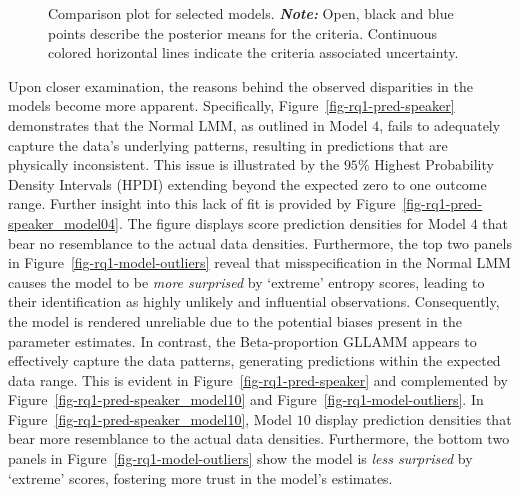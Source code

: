\documentclass[
  authoryear,
  preprint,
  1p]{elsarticle}
\begin{document}
\label{cell-fig-rq1-waic-psis}
\begin{figure}[H]


\caption{\label{fig-rq1-waic-psis}{Comparison plot for selected models.
\textbf{\emph{Note:}} Open, black and blue points describe the posterior
means for the criteria. Continuous colored horizontal lines indicate the
criteria associated uncertainty.}}

\end{figure}%

Upon closer examination, the reasons behind the observed disparities in
the models become more apparent. {Specifically,
Figure~\ref{fig-rq1-pred-speaker} demonstrates that the Normal LMM, as
outlined in Model \(4\), fails to adequately capture the data's
underlying patterns, resulting in predictions that are physically
inconsistent. This issue is illustrated by the \(95\%\) Highest
Probability Density Intervals (HPDI) extending beyond the expected zero
to one outcome range. Further insight into this lack of fit is provided
by Figure~\ref{fig-rq1-pred-speaker_model04}. The figure displays score
prediction densities for Model \(4\) that bear no resemblance to the
actual data densities.} Furthermore, the top two panels in
Figure~\ref{fig-rq1-model-outliers} reveal that misspecification in the
Normal LMM causes the model to be \emph{more surprised} by `extreme'
entropy scores, leading to their identification as highly unlikely and
influential observations. Consequently, the model is rendered unreliable
due to the potential biases present in the parameter estimates. In
contrast, the Beta-proportion GLLAMM appears to effectively capture the
data patterns, generating predictions within the expected data range.
This is evident in Figure~\ref{fig-rq1-pred-speaker} and complemented by
Figure~\ref{fig-rq1-pred-speaker_model10} and
Figure~\ref{fig-rq1-model-outliers}. In
Figure~\ref{fig-rq1-pred-speaker_model10}, Model \(10\) display
prediction densities that bear more resemblance to the actual data
densities. Furthermore, the bottom two panels in
Figure~\ref{fig-rq1-model-outliers} show the model is \emph{less
surprised} by `extreme' scores, fostering more trust in the model's
estimates.
\end{document}
